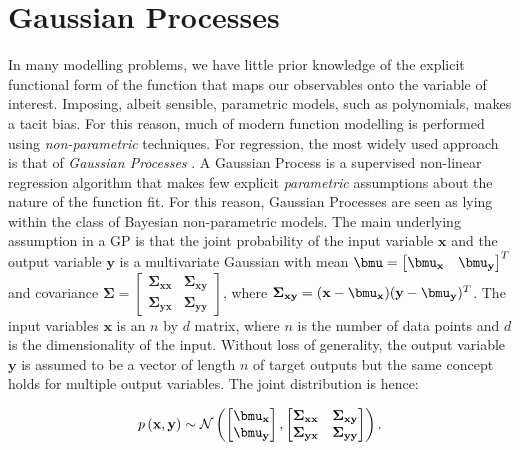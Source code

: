 \documentclass[useAMS,usenatbib,fleqn]{mn2e}
\begin{document}
\section{Gaussian Processes}
\label{sec-gaussian-process}
In many modelling problems, we have little prior knowledge of the explicit functional form of the function that maps our observables onto the variable of interest. Imposing, albeit sensible, parametric models, such as polynomials, makes a tacit bias. For this reason, much of modern function modelling is performed using \emph{non-parametric} techniques. For regression, the most widely used approach is that of \emph{Gaussian Processes} \citep{rasmussen2006gaussian}.
A Gaussian Process is a supervised non-linear regression algorithm that makes few explicit \emph{parametric} assumptions about the nature of the function fit. For this reason, Gaussian Processes are seen as lying within the class of Bayesian non-parametric models. The main underlying assumption in a GP is that the joint probability of the input variable $\mathbf{x}$ and the output variable $\mathbf{y}$ is a multivariate Gaussian with mean $\bmu=\begin{bmatrix} \bmu_{\mathbf{x}} & \bmu_{\mathbf{y}}\end{bmatrix}^{T}$ and covariance $\mathbf\Sigma=\begin{bmatrix}\mathbf\Sigma_{\mathbf{x}\mathbf{x}} & \mathbf\Sigma_{\mathbf{x}\mathbf{y}} \\ \mathbf\Sigma_{\mathbf{y}\mathbf{x}} & \mathbf\Sigma_{\mathbf{y}\mathbf{y}} \end{bmatrix}$, where $\mathbf\Sigma_{\mathbf{x}\mathbf{y}}=(\mathbf{x}-\bmu_{\mathbf{x}})(\mathbf{y}-\bmu_{\mathbf{y}})^{T}$. The input variables $\mathbf{x}$ is an $n$ by $d$ matrix, where $n$ is the number of data points and $d$ is the dimensionality of the input. Without loss of generality, the output variable $\mathbf{y}$ is assumed to be a vector of length $n$ of target outputs but the same concept holds for multiple output variables. The joint distribution is hence:

\begin{equation}
p\left ( \mathbf{x},\mathbf{y}\right) \sim \mathcal{N} \left ( \begin{bmatrix}\bmu_{\mathbf{x}}\\\bmu_{\mathbf{y}} \end{bmatrix}, \begin{bmatrix}\mathbf\Sigma_{\mathbf{x}\mathbf{x}} & \mathbf\Sigma_{\mathbf{x}\mathbf{y}}\\\mathbf\Sigma_{\mathbf{y}\mathbf{x}} & \mathbf\Sigma_{\mathbf{y}\mathbf{y}} \end{bmatrix}\right ).
\end{equation}
\end{document}
